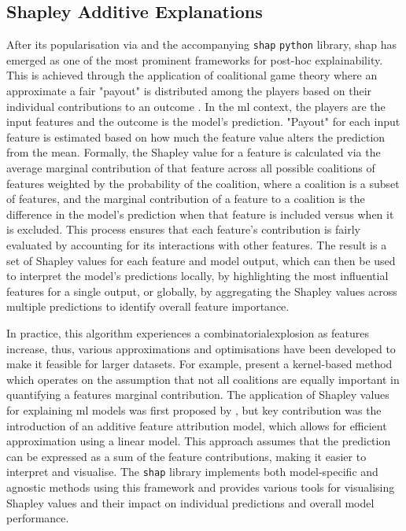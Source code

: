 \subsection{Shapley Additive Explanations}

After its popularisation via \cite{Lundberg2017} and the accompanying \texttt{shap} \texttt{python} library, \acrfull{shap} has emerged as one of the most prominent frameworks for post-hoc explainability. This is achieved through the application of coalitional game theory where an approximate a fair "payout" is distributed among the players based on their individual contributions to an outcome \citep{Shapley1953}. In the \acrshort{ml} context, the players are the input features and the outcome is the model's prediction. "Payout" for each input feature is estimated based on how much the feature value alters the prediction from the mean. Formally, the Shapley value for a feature is calculated via the average marginal contribution of that feature across all possible coalitions of features weighted by the probability of the coalition, where a coalition is a subset of features, and the marginal contribution of a feature to a coalition is the difference in the model's prediction when that feature is included versus when it is excluded. This process ensures that each feature's contribution is fairly evaluated by accounting for its interactions with other features. The result is a set of Shapley values for each feature and model output, which can then be used to interpret the model's predictions locally, by highlighting the most influential features for a single output, or globally, by aggregating the Shapley values across multiple predictions to identify overall feature importance.

In practice, this algorithm experiences a \gls{combinatorialexplosion} as features increase, thus, various approximations and optimisations have been developed to make it feasible for larger datasets. For example, \cite{Lundberg2017} present a kernel-based method which operates on the assumption that not all coalitions are equally important in quantifying a features marginal contribution. The application of Shapley values for explaining \acrshort{ml} models was first proposed by \cite{trumbelj2011}, but \cite{Lundberg2017} key contribution was the introduction of an additive feature attribution model, which allows for efficient approximation using a linear model. This approach assumes that the prediction can be expressed as a sum of the feature contributions, making it easier to interpret and visualise. The \texttt{shap} library implements both model-specific and agnostic methods using this framework and provides various tools for visualising Shapley values and their impact on individual predictions and overall model performance.

